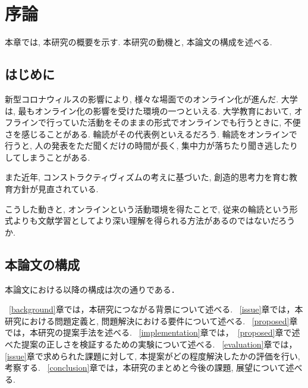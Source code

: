 \chapter{序論}
\label{introduction}

本章では, 本研究の概要を示す. 本研究の動機と, 本論文の構成を述べる. 

\section{はじめに}
\label{introduction:background}
新型コロナウィルスの影響により, 様々な場面でのオンライン化が進んだ. 大学は, 最もオンライン化の影響を受けた環境の一つといえる. 大学教育において, オフラインで行っていた活動をそのままの形式でオンラインでも行うときに, 不便さを感じることがある. 輪読がその代表例といえるだろう. 輪読をオンラインで行うと, 人の発表をただ聞くだけの時間が長く, 集中力が落ちたり聞き逃したりしてしまうことがある. 

また近年, コンストラクティヴィズムの考えに基づいた, 創造的思考力を育む教育方針が見直されている. 

こうした動きと, オンラインという活動環境を得たことで, 従来の輪読という形式よりも文献学習としてより深い理解を得られる方法があるのではないだろうか. 

\section{本論文の構成}

本論文における以降の構成は次の通りである．

~\ref{background}章では，本研究につながる背景について述べる. 
~\ref{issue}章では，本研究における問題定義と, 問題解決における要件について述べる. 
~\ref{proposed}章では，本研究の提案手法を述べる. 
~\ref{implementation}章では，~\ref{proposed}章で述べた提案の正しさを検証するための実験について述べる. 
~\ref{evaluation}章では，\ref{issue}章で求められた課題に対して, 本提案がどの程度解決したかの評価を行い, 考察する. 
~\ref{conclusion}章では，本研究のまとめと今後の課題, 展望について述べる. 

